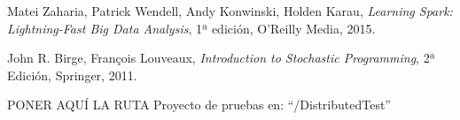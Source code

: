 

\begin{thebibliography}{99}
% 
% 
% 

 Matei Zaharia, Patrick Wendell, Andy Konwinski, Holden Karau, {\it Learning Spark: Lightning-Fast Big Data Analysis}, 1ª edición, O'Reilly Media, 2015.

 John R. Birge, François Louveaux, {\it Introduction to Stochastic Programming}, 2ª Edición, Springer, 2011.


 PONER AQUÍ LA RUTA
 Proyecto de pruebas en: ``/DistributedTest''

\end{thebibliography}

